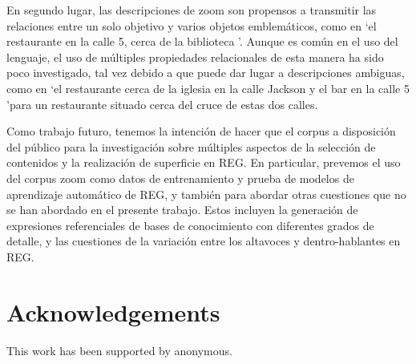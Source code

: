 En segundo lugar, las descripciones de zoom son propensos a transmitir las relaciones entre un solo objetivo y varios objetos emblem\'aticos, como en `el restaurante en la calle 5, cerca de la biblioteca '. Aunque es com\'un en el uso del lenguaje, el uso de m\'ultiples propiedades relacionales de esta manera ha sido poco investigado, tal vez debido a que puede dar lugar a descripciones ambiguas, como en `el restaurante cerca de la iglesia en la calle Jackson y el bar en la calle 5 'para un restaurante situado cerca del cruce de estas dos calles.

Como trabajo futuro, tenemos la intenci\'on de hacer que el corpus a disposici\'on del p\'ublico para la investigaci\'on sobre m\'ultiples aspectos de la selecci\'on de contenidos y la realizaci\'on de superficie en REG. En particular, prevemos el uso del corpus zoom como datos de entrenamiento y prueba de modelos de aprendizaje autom\'atico de REG, y tambi\'en para abordar otras cuestiones que no se han abordado en el presente trabajo. Estos incluyen la generaci\'on de expresiones referenciales de bases de conocimiento con diferentes grados de detalle, y las cuestiones de la variaci\'on entre los altavoces y dentro-hablantes en REG.

\section*{Acknowledgements}
This work has been supported by anonymous. 
